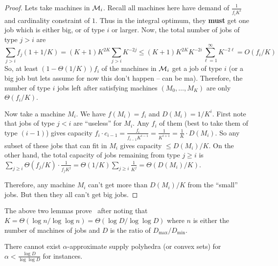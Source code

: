 	\begin{proof}
		Lets take machines in $\mathcal{M}_i$. Recall all machines here have demand of $\frac{1}{f_iK^i}$ and cardinality constraint of $1$.
		Thus in the integral optimum, they {\bf must} get one job which is either big, or of type $i$ or larger.
		Now, the total number of jobs of type $j > i$ are
		\[
		\sum_{j>i} f_j(1+1/K) = (K+1)K^{2K} \sum_{j > i} K^{-2j} \leq  (K+1)K^{2K}K^{-2i} \sum_{\ell=1}^\infty K^{-2\ell} = O\left(f_i/K\right)
		\]
		So, at least $(1 - \Theta(1/K))f_i$ of the machines in $\mathcal{M}_i$ get a job of type $i$ (or a big job but lets assume for now this don't happen -- can be ma).
		Therefore, the number of type $i$ jobs left after satisfying machines $(M_0,\ldots,M_K)$ are only $\Theta(f_i/K)$.
		
		
		Now take a machine $M_i$. We have $f(M_i) = f_i$ and $D(M_i) = 1/K^i$.
		First note that jobs of type $j < i$ are ``useless'' for $M_i$. Any $f_i$ of them (best to take them of type $(i-1)$)  gives capacity $f_i\cdot c_{i-1}  = \frac{f_i}{f_{i-1}K^{i-1}} = \frac{1}{K^{i+1}} =  \frac{1}{K}\cdot D(M_i)$. So any subset of these jobs that can fit in $M_i$ gives capacity $\leq D(M_i)/K$.
		On the other hand, the total capacity of jobs remaining from type $j \geq i$ is  $\sum_{j\geq i} \Theta(f_j/K)\cdot \frac{1}{f_jK^j} = \Theta(1/K)\sum_{j\geq i} \frac{1}{K^j} = \Theta(D(M_i)/K)$.
		
		Therefore, any machine $M_i$ can't get more than $D(M_i)/K$ from the ``small'' jobs. But then they all can't get big jobs.
	\end{proof}
	The above two lemmas prove~ after noting that $K = \Theta(\log n/\log\log n) = \Theta(\log D/\log \log D)$ where $n$ is either the number of machines of jobs and $D$ is the ratio of $D_{\max}/D_{\min}$.

\begin{theorem} \label{fthm:supply-bad-cckp}
There cannot exist $\alpha$-approximate supply polyhedra (or convex sets) for $\alpha < \frac{\log D}{\log \log D}$ for \cckp instances.
\end{theorem}

